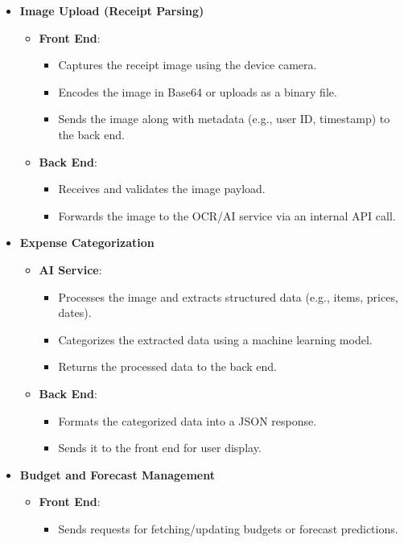 \documentclass[12pt, titlepage]{article}
\begin{document}
\begin{enumerate}
\begin{itemize}
		\item \textbf{Image Upload (Receipt Parsing)}
		\begin{itemize}
			\item \textbf{Front End}:
			\begin{itemize}
				\item Captures the receipt image using the device camera.
				\item Encodes the image in Base64 or uploads as a binary file.
				\item Sends the image along with metadata (e.g., user ID, timestamp) to the back end.
			\end{itemize}
			\item \textbf{Back End}:
			\begin{itemize}
				\item Receives and validates the image payload.
				\item Forwards the image to the OCR/AI service via an internal API call.
			\end{itemize}
		\end{itemize}
		\item \textbf{Expense Categorization}
		\begin{itemize}
			\item \textbf{AI Service}:
			\begin{itemize}
				\item Processes the image and extracts structured data (e.g., items, prices, dates).
				\item Categorizes the extracted data using a machine learning model.
				\item Returns the processed data to the back end.
			\end{itemize}
			\item \textbf{Back End}:
			\begin{itemize}
				\item Formats the categorized data into a JSON response.
				\item Sends it to the front end for user display.
			\end{itemize}
		\end{itemize}
		\item \textbf{Budget and Forecast Management}
		\begin{itemize}
			\item \textbf{Front End}:
			\begin{itemize}
				\item Sends requests for fetching/updating budgets or forecast predictions.

\end{itemize}
\end{itemize}
\end{itemize}
\end{enumerate}
\end{document}
